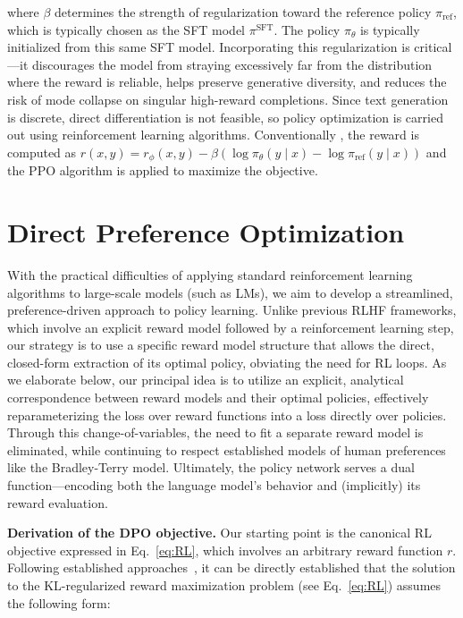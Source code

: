 where $\beta$ determines the strength of regularization toward the reference policy $\pi_\text{ref}$, which is typically chosen as the SFT model $\pi^\text{SFT}$. The policy $\pi_\theta$ is typically initialized from this same SFT model. Incorporating this regularization is critical—it discourages the model from straying excessively far from the distribution where the reward is reliable, helps preserve generative diversity, and reduces the risk of mode collapse on singular high-reward completions. Since text generation is discrete, direct differentiation is not feasible, so policy optimization is carried out using reinforcement learning algorithms. Conventionally \citep{ziegler2020finetuning, stiennon2022learning, bai2022training, ouyang2022training}, the reward is computed as ${r(x, y) = r_{\phi}(x, y) -\beta (\log \pi_{\theta}(y\mid x) - \log \pi_\text{ref}(y\mid x))}$ and the PPO algorithm \cite{schulman2017proximal} is applied to maximize the objective.

\section{Direct Preference Optimization}\label{sec:DPO}

With the practical difficulties of applying standard reinforcement learning algorithms to large-scale models (such as LMs), we aim to develop a streamlined, preference-driven approach to policy learning. Unlike previous RLHF frameworks, which involve an explicit reward model followed by a reinforcement learning step, our strategy is to use a specific reward model structure that allows the direct, closed-form extraction of its optimal policy, obviating the need for RL loops. As we elaborate below, our principal idea is to utilize an explicit, analytical correspondence between reward models and their optimal policies, effectively reparameterizing the loss over reward functions into a loss directly over policies. Through this change-of-variables, the need to fit a separate reward model is eliminated, while continuing to respect established models of human preferences like the Bradley-Terry model. Ultimately, the policy network serves a dual function—encoding both the language model's behavior and (implicitly) its reward evaluation.

\textbf{Derivation of the DPO objective.} Our starting point is the canonical RL objective expressed in Eq.~\ref{eq:RL}, which involves an arbitrary reward function $r$. Following established approaches~\citep{peters2007reinforcement, peng2019advantage, korbak2022reinforcement, go2023aligning}, it can be directly established that the solution to the KL-regularized reward maximization problem (see Eq.~\ref{eq:RL}) assumes the following form:


